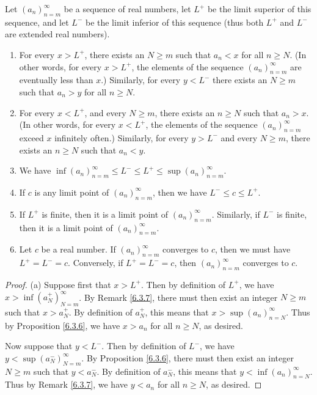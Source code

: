 \begin{proposition}\label{6.4.12}
    Let \((a_n)_{n = m}^\infty\) be a sequence of real numbers, let \(L^+\) be the limit superior of this sequence, and let \(L^-\) be the limit inferior of this sequence
    (thus both \(L^+\) and \(L^-\) are extended real numbers).
    \begin{enumerate}
        \item For every \(x > L^+\), there exists an \(N \geq m\) such that \(a_n < x\) for all \(n \geq N\).
              (In other words, for every \(x > L^+\), the elements of the sequence \((a_n)_{n = m}^\infty\) are eventually less than \(x\).)
              Similarly, for every \(y < L^-\) there exists an \(N \geq m\) such that \(a_n > y\) for all \(n \geq N\).
        \item For every \(x < L^+\), and every \(N \geq m\), there exists an \(n \geq N\) such that \(a_n > x\).
              (In other words, for every \(x < L^+\), the elements of the sequence \((a_n)_{n = m}^\infty\) exceed \(x\) infinitely often.)
              Similarly, for every \(y > L^-\) and every \(N \geq m\), there exists an \(n \geq N\) such that \(a_n < y\).
        \item We have \(\inf(a_n)_{n = m}^\infty \leq L^- \leq L^+ \leq \sup(a_n)_{n = m}^\infty\).
        \item If \(c\) is any limit point of \((a_n)_{n = m}^\infty\), then we have \(L^- \leq c \leq L^+\).
        \item If \(L^+\) is finite, then it is a limit point of \((a_n)_{n = m}^\infty\).
              Similarly, if \(L^-\) is finite, then it is a limit point of \((a_n)_{n = m}^\infty\).
        \item Let \(c\) be a real number.
              If \((a_n)_{n = m}^\infty\) converges to \(c\), then we must have \(L^+ = L^- = c\).
              Conversely, if \(L^+ = L^- = c\), then \((a_n)_{n = m}^\infty\) converges to \(c\).
    \end{enumerate}
\end{proposition}

\begin{proof}{(a)}
    Suppose first that \(x > L^+\).
    Then by definition of \(L^+\), we have \(x > \inf(a_N^+)_{N = m}^\infty\).
    By Remark \ref{6.3.7}, there must then exist an integer \(N \geq m\) such that \(x > a_N^+\).
    By definition of \(a_N^+\), this means that \(x > \sup(a_n)_{n = N}^\infty\).
    Thus by Proposition \ref{6.3.6}, we have \(x > a_n\) for all \(n \geq N\), as desired.

    Now suppose that \(y < L^-\).
    Then by definition of \(L^-\), we have \(y < \sup(a_N^-)_{N = m}^\infty\).
    By Proposition \ref{6.3.6}, there must then exist an integer \(N \geq m\) such that \(y < a_N^-\).
    By definition of \(a_N^-\), this means that \(y < \inf(a_n)_{n = N}^\infty\).
    Thus by Remark \ref{6.3.7}, we have \(y < a_n\) for all \(n \geq N\), as desired.
\end{proof}

